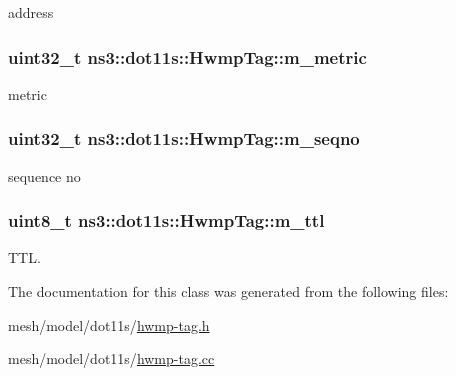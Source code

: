 address 

\subsubsection[{\texorpdfstring{m\+\_\+metric}{m_metric}}]{\setlength{\rightskip}{0pt plus 5cm}uint32\+\_\+t ns3\+::dot11s\+::\+Hwmp\+Tag\+::m\+\_\+metric\hspace{0.3cm}{\ttfamily [private]}}\hypertarget{classns3_1_1dot11s_1_1HwmpTag_aa55f54e47fb39aa917a29552620f8dbe}{}\label{classns3_1_1dot11s_1_1HwmpTag_aa55f54e47fb39aa917a29552620f8dbe}


metric 

\subsubsection[{\texorpdfstring{m\+\_\+seqno}{m_seqno}}]{\setlength{\rightskip}{0pt plus 5cm}uint32\+\_\+t ns3\+::dot11s\+::\+Hwmp\+Tag\+::m\+\_\+seqno\hspace{0.3cm}{\ttfamily [private]}}\hypertarget{classns3_1_1dot11s_1_1HwmpTag_ae15e0ad85f6f8e437e285a2d2fee66f1}{}\label{classns3_1_1dot11s_1_1HwmpTag_ae15e0ad85f6f8e437e285a2d2fee66f1}


sequence no 

\subsubsection[{\texorpdfstring{m\+\_\+ttl}{m_ttl}}]{\setlength{\rightskip}{0pt plus 5cm}uint8\+\_\+t ns3\+::dot11s\+::\+Hwmp\+Tag\+::m\+\_\+ttl\hspace{0.3cm}{\ttfamily [private]}}\hypertarget{classns3_1_1dot11s_1_1HwmpTag_a998c4149463609ac797f3d9bfc11daf0}{}\label{classns3_1_1dot11s_1_1HwmpTag_a998c4149463609ac797f3d9bfc11daf0}


T\+TL. 



The documentation for this class was generated from the following files\+:\begin{DoxyCompactItemize}
\item 
mesh/model/dot11s/\hyperlink{hwmp-tag_8h}{hwmp-\/tag.\+h}\item 
mesh/model/dot11s/\hyperlink{hwmp-tag_8cc}{hwmp-\/tag.\+cc}\end{DoxyCompactItemize}
